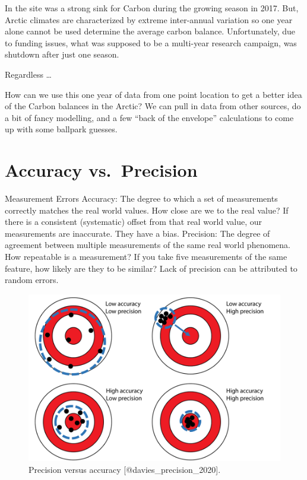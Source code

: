 \documentclass[
]{book}
\begin{document}
In the site was a strong sink for Carbon during the growing season in 2017. But, Arctic climates are characterized by extreme inter-annual variation so one year alone cannot be used determine the average carbon balance. Unfortunately, due to funding issues, what was supposed to be a multi-year research campaign, was shutdown after just one season.

Regardless \ldots{}

How can we use this one year of data from one point location to get a better idea of the Carbon balances in the Arctic? We can pull in data from other sources, do a bit of fancy modelling, and a few ``back of the envelope'' calculations to come up with some ballpark guesses.

\hypertarget{accuracy-vs.-precision}{%
\section{Accuracy vs.~Precision}\label{accuracy-vs.-precision}}

Measurement Errors
Accuracy:
The degree to which a set of measurements correctly matches the real world values. How close are we to the real value?
If there is a consistent (systematic) offset from that real world value, our measurements are inaccurate. They have a bias.
Precision:
The degree of agreement between multiple measurements of the same real world phenomena. How repeatable is a measurement?
If you take five measurements of the same feature, how likely are they to be similar? Lack of precision can be attributed to random errors.

\begin{figure}
\includegraphics[width=0.9\linewidth]{images/16-accuracy-vs-precision} \caption{Precision versus accuracy [@davies_precision_2020].}\label{fig:16-accuracy-vs-precision}
\end{figure}
\end{document}

